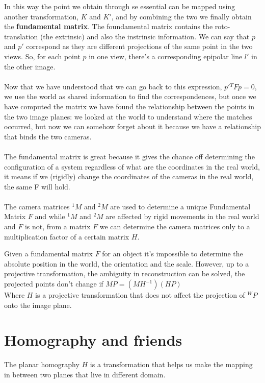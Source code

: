 In this way the point we obtain through se essential can be mapped using another transformation, \(K\) and \(K'\), and by combining the two we finally obtain the \textbf{fundamental matrix}. The foundamental matrix contains the roto-translation (the extrinsic) and also the instrinsic information. We can say that \(p\) and \(p'\) correspond as they are different projections of the same point in the two views. So, for each point \(p\) in one view, there's a corresponding epipolar
line \(l'\) in the other image.
\\
\\
Now that we have understood that we can go back to this expression, \(p' {}^TFp=0\), we use the world as shared information to find the correspondences, but once we have computed the matrix we have found the relationship between the points in the two image planes: we looked at the world to understand where the matches occurred, but now we can somehow forget about it because we have a relationship that binds the two cameras.
\\
\\
The fundamental matrix is great because it gives the chance off determining the configuration of a system regardless of what are the coordinates in the real world, it means if we (rigidly) change the coordinates of the cameras in the real world, the same F will hold.
\\
\\
The camera matrices \({}^1M\) and \({}^2M\) are used to determine a unique Fundamental Matrix \(F\) and while \({}^1M\) and \({}^2M\) are affected by rigid movements in the real world and \(F\) is not,  from a matrix \(F\) we can determine the camera matrices only to a multiplication factor of a certain matrix \(H\).

Given a fundamental matrix \(F\) for an object it's impossible to determine the absolute position in the world, the orientation and the scale. 
However, up to a projective transformation, the ambiguity in reconstruction can be solved, the projected points don't change if
\(
    MP = (MH^{-1})(HP)    
\)
\\
Where \(H\) is a projective transformation that does not affect the projection of \({}^WP\) onto the image plane.

\section{Homography and friends}

The planar homography \(H\) is a transformation that helps us make the mapping in between two planes that live in different domain. 

